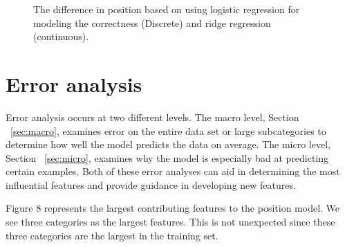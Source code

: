 \documentclass[letterpaper]{article}
\begin{document}
\begin{figure}[H]
	\begin{center}
	\end{center}
	\caption{The difference in position based on using logistic regression for modeling the correctness (Discrete) and ridge regression (continuous).}
	\label{fig:corr_cont}
\end{figure}

\section{Error analysis}
Error analysis occurs at two different levels.  The macro level, Section ~\ref{sec:macro}, examines error on the entire data set or large subcategories to determine how well the model predicts the data on average.  The micro level, Section ~\ref{sec:micro}, examines why the model is especially bad at predicting certain examples.  Both of these error analyses can aid in determining the most influential features and provide guidance in developing new features.  

Figure 8 represents the largest contributing features to the position model.  We see three categories as the largest features.  This is not unexpected since these three categories are the largest in the training set.  
\end{document}
